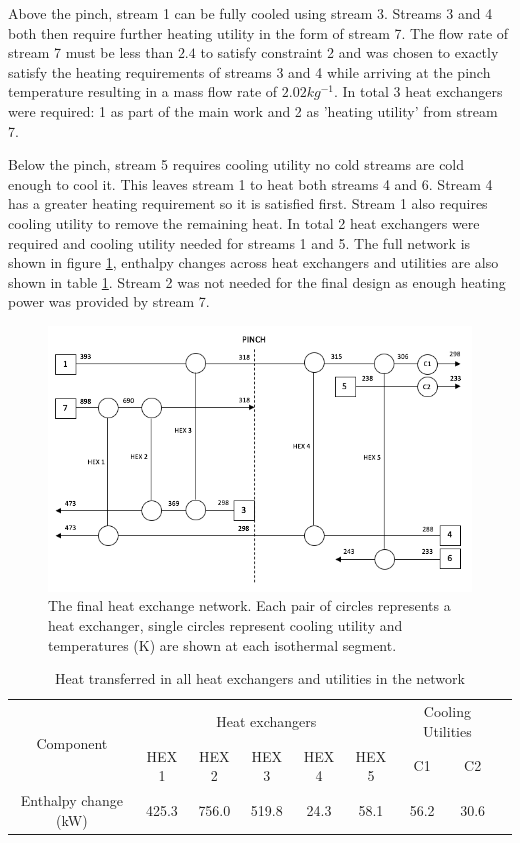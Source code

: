 Above the pinch, stream 1 can be fully cooled using stream 3. Streams 3 and 4 both then require further heating utility in the form of stream 7. The flow rate of stream 7 must be less than $2.4$ to satisfy constraint 2 and was chosen to exactly satisfy the heating requirements of streams 3 and 4 while arriving at the pinch temperature resulting in a mass flow rate of $2.02 kg^{-1}$. In total 3 heat exchangers were required: 1 as part of the main work and 2 as 'heating utility' from stream 7. 

Below the pinch, stream 5 requires cooling utility no cold streams are cold enough to cool it. This leaves stream 1 to heat both streams 4 and 6. Stream 4 has a greater heating requirement so it is satisfied first. Stream 1 also requires cooling utility to remove the remaining heat. In total 2 heat exchangers were required and cooling utility needed for streams 1 and 5. The full network is shown in figure \ref{fig:heatexnetwork}, enthalpy changes across heat exchangers and utilities are also shown in table \ref{tab:powerhex}. Stream 2 was not needed for the final design as enough heating power was provided by stream 7. 

\begin{figure} [h]
\centering
\includegraphics[width=1\textwidth]{./pictures/heatexnetwork.png}
  \caption{The final heat exchange network. Each pair of circles represents a heat exchanger, single circles represent cooling utility and temperatures (K) are shown at each isothermal segment.} \label{fig:heatexnetwork}
  \end{figure}

\begin {table} [h]
\begin{center}
\caption{Heat transferred in all heat exchangers and utilities in the network} \label{tab:powerhex} 
\begin{tabular}{ |c|c|c|c|c|c|c|c|c| }
 \hline
\multirow{2}{*}{Component} & \multicolumn{5}{|c|}{Heat exchangers }& \multicolumn{2}{|c|}{Cooling Utilities}\\ 
 \cline{2-8}
   & HEX 1 & HEX 2 & HEX 3 & HEX 4 &HEX 5 & C1 & C2\\ 
 \hline
 Enthalpy change (kW) & 425.3 & 756.0 & 519.8 & 24.3 & 58.1 & 56.2 & 30.6\\ 
 \hline
\end{tabular}
\end{center}  
\end {table}

